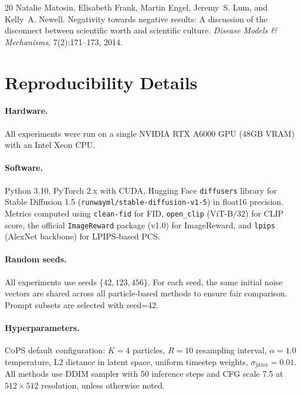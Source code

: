 \documentclass{article}
\newcommand{\cops}{\textsc{CoPS}}
\newcommand{\pcs}{\textsc{PCS}}
\begin{document}
\begin{thebibliography}{20}
Natalie Matosin, Elisabeth Frank, Martin Engel, Jeremy~S. Lum, and Kelly~A. Newell.
\newblock Negativity towards negative results: A discussion of the disconnect between scientific worth and scientific culture.
\newblock \emph{Disease Models \& Mechanisms}, 7(2):171--173, 2014.

\end{thebibliography}

\appendix
\section{Reproducibility Details}
\label{app:reproducibility}

\paragraph{Hardware.} All experiments were run on a single NVIDIA RTX A6000 GPU (48GB VRAM) with an Intel Xeon CPU.

\paragraph{Software.} Python 3.10, PyTorch 2.x with CUDA, Hugging Face \texttt{diffusers} library for Stable Diffusion 1.5 (\texttt{runwayml/stable-diffusion-v1-5}) in float16 precision. Metrics computed using \texttt{clean-fid} for FID, \texttt{open\_clip} (ViT-B/32) for CLIP score, the official \texttt{ImageReward} package (v1.0) for ImageReward, and \texttt{lpips} (AlexNet backbone) for LPIPS-based \pcs{}.

\paragraph{Random seeds.} All experiments use seeds $\{42, 123, 456\}$. For each seed, the same initial noise vectors are shared across all particle-based methods to ensure fair comparison. Prompt subsets are selected with seed=42.

\paragraph{Hyperparameters.} \cops{} default configuration: $K=4$ particles, $R=10$ resampling interval, $\alpha=1.0$ temperature, L2 distance in latent space, uniform timestep weights, $\sigma_{\text{jitter}}=0.01$. All methods use DDIM sampler with 50 inference steps and CFG scale 7.5 at $512 \times 512$ resolution, unless otherwise noted.
\end{document}
